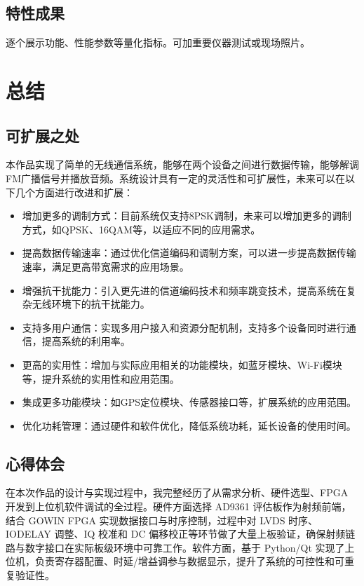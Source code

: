 \documentclass[10pt, a4paper]{article}
\begin{document}
\subsection{特性成果}
逐个展示功能、性能参数等量化指标。可加重要仪器测试或现场照片。

\section{总结}

\subsection{可扩展之处}
本作品实现了简单的无线通信系统，能够在两个设备之间进行数据传输，能够解调FM广播信号并播放音频。系统设计具有一定的灵活性和可扩展性，未来可以在以下几个方面进行改进和扩展：
\begin{itemize}[leftmargin=*]
    \item 增加更多的调制方式：目前系统仅支持8PSK调制，未来可以增加更多的调制方式，如QPSK、16QAM等，以适应不同的应用需求。
    \item 提高数据传输速率：通过优化信道编码和调制方案，可以进一步提高数据传输速率，满足更高带宽需求的应用场景。
    \item 增强抗干扰能力：引入更先进的信道编码技术和频率跳变技术，提高系统在复杂无线环境下的抗干扰能力。
    \item 支持多用户通信：实现多用户接入和资源分配机制，支持多个设备同时进行通信，提高系统的利用率。
    \item 更高的实用性：增加与实际应用相关的功能模块，如蓝牙模块、Wi-Fi模块等，提升系统的实用性和应用范围。
    \item 集成更多功能模块：如GPS定位模块、传感器接口等，扩展系统的应用范围。
    \item 优化功耗管理：通过硬件和软件优化，降低系统功耗，延长设备的使用时间。
\end{itemize}

\subsection{心得体会}
在本次作品的设计与实现过程中，我完整经历了从需求分析、硬件选型、FPGA 开发到上位机软件调试的全过程。硬件方面选择 AD9361 评估板作为射频前端，结合 GOWIN FPGA 实现数据接口与时序控制，过程中对 LVDS 时序、IODELAY 调整、IQ 校准和 DC 偏移校正等环节做了大量上板验证，确保射频链路与数字接口在实际板级环境中可靠工作。软件方面，基于 Python/Qt 实现了上位机，负责寄存器配置、时延/增益调参与数据显示，提升了系统的可控性和可重复验证性。
\end{document}
